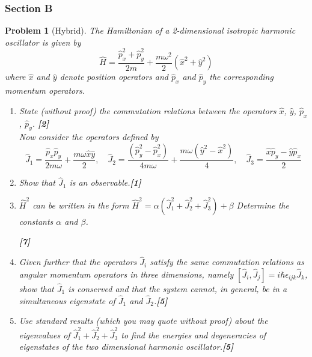 \documentclass[a4paper]{article}
\theoremstyle{new}
\newtheorem{qns}{Problem}[subsection]
\begin{document}
\subsubsection{Section B}
\begin{qns}[Hybrid]
The Hamiltonian of a 2-dimensional isotropic harmonic oscillator is given by
$$\hat{H}=\frac{\hat{p}_x^2+\hat{p}_y^2}{2m}+\frac{m\omega^2}{2}(\hat{x}^2+\hat{y}^2)$$
where $\hat{x}$ and $\hat{y}$ denote position operators and $\hat{p}_x$ and $\hat{p}_y$ the corresponding momentum operators.
\begin{enumerate}[label=(\roman*)]
\item State (without proof) the commutation relations between the operators $\hat{x}$, $\hat{y}$, $\hat{p}_x$, $\hat{p}_y$. \hfill\textbf{[2]}\\[5pt]
Now consider the operators defined by
$$\hat{J}_1=\frac{\hat{p}_x\hat{p}_y}{2m\omega}+\frac{m\omega\hat{x}\hat{y}}{2},\quad\hat{J}_2=\frac{(\hat{p}_y^2-\hat{p}_x^2)}{4m\omega}+\frac{m\omega(\hat{y}^2-\hat{x}^2)}{4},\quad\hat{J}_3=\frac{\hat{x}\hat{p}_y-\hat{y}\hat{p}_x}{2}$$
\item Show that $\hat{J}_1$ is an observable.\hfill\textbf{[1]}
\item $\hat{H}^2$ can be written in the form $\hat{H}^2=\alpha(\hat{J}_1^2+\hat{J}_2^2+\hat{J}_3^2)+\beta$ Determine the constants $\alpha$ and $\beta$.

\hfill\textbf{[7]}
\item Given further that the operators $\hat{J}_i$ satisfy the same commutation relations as angular momentum operators in three dimensions, namely $[\hat{J}_i,\hat{J}_j]=i\hbar\epsilon_{ijk}\hat{J}_k$, show that $\hat{J}_1$ is conserved and that the system cannot, in general, be in a simultaneous eigenstate of $\hat{J}_1$ and $\hat{J}_2$.\hfill\textbf{[5]}
\item Use standard results (which you may quote without proof) about the eigenvalues of $\hat{J}_1^2+\hat{J}_2^2+\hat{J}_3^2$ to find the energies and degeneracies of eigenstates of the two dimensional harmonic oscillator.\hfill\textbf{[5]}
\end{enumerate}
\end{qns}
\end{document}

